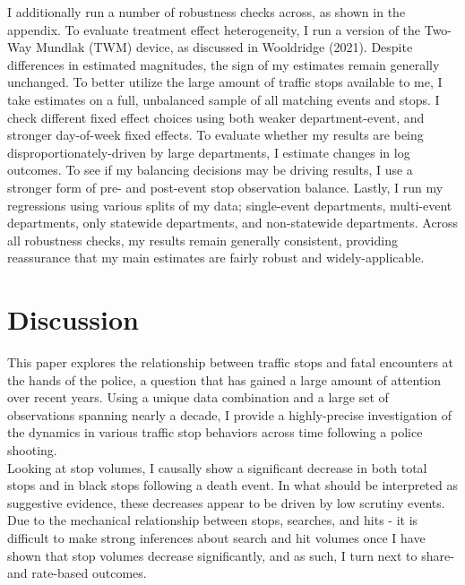 \documentclass[12pt,a4paper]{article}
\begin{document}
I additionally run a number of robustness checks across, as shown in the appendix. To evaluate treatment effect heterogeneity, I run a version of the Two-Way Mundlak (TWM) device, as discussed in Wooldridge (2021). Despite differences in estimated magnitudes, the sign of my estimates remain generally unchanged. To better utilize the large amount of traffic stops available to me, I take estimates on a full, unbalanced sample of all matching events and stops. I check different fixed effect choices using both weaker department-event, and stronger day-of-week fixed effects. To evaluate whether my results are being disproportionately-driven by large departments, I estimate changes in log outcomes. To see if my balancing decisions may be driving results, I use a stronger form of pre- and post-event stop observation balance. Lastly, I run my regressions using various splits of my data; single-event departments, multi-event departments, only statewide departments, and non-statewide departments. Across all robustness checks, my results remain generally consistent, providing reassurance that my main estimates are fairly robust and widely-applicable. \\

\section{Discussion}
This paper explores the relationship between traffic stops and fatal encounters at the hands of the police, a question that has gained a large amount of attention over recent years. Using a unique data combination and a large set of observations spanning nearly a decade, I provide a highly-precise investigation of the dynamics in various traffic stop behaviors across time following a police shooting. \\

Looking at stop volumes, I causally show a significant decrease in both total stops and in black stops following a death event. In what should be interpreted as suggestive evidence, these decreases appear to be driven by low scrutiny events. Due to the mechanical relationship between stops, searches, and hits - it is difficult to make strong inferences about search and hit volumes once I have shown that stop volumes decrease significantly, and as such, I turn next to share- and rate-based outcomes. \\
\end{document}
